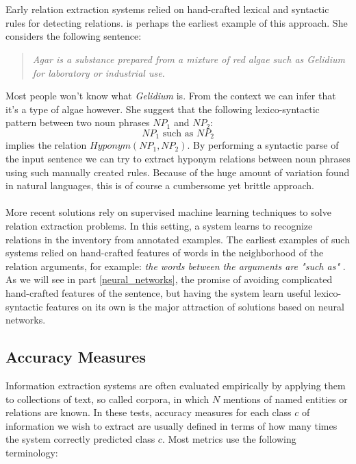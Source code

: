 \\\\
Early relation extraction systems relied on hand-crafted lexical and syntactic rules for detecting relations. \citet{hearst1992} is perhaps the earliest example of this approach. She considers the following sentence:
\begin{quote}
	\textit{Agar is a substance prepared from a mixture of red algae such as Gelidium for laboratory or industrial use.}
\end{quote}
Most people won't know what \textit{Gelidium} is. From the context we can infer that it's a type of algae however. She suggest that the following lexico-syntactic pattern between two noun phrases $NP_1$ and $NP_2$:
$$
NP_1\text{ such as }NP_2
$$
implies the relation $Hyponym(NP_1, NP_2)$. By performing a syntactic parse of the input sentence we can try to extract hyponym relations between noun phrases using such manually created rules. Because of the huge amount of variation found in natural languages, this is of course a cumbersome yet brittle approach.
\\\\
More recent solutions rely on supervised machine learning techniques to solve relation extraction problems. In this setting, a system learns to recognize relations in the inventory from annotated examples. The earliest examples of such systems relied on hand-crafted features of words in the neighborhood of the relation arguments, for example: \textit{the words between the arguments are "such as"} \citep{jurafsky09}. As we will see in part \ref{neural_networks}, the promise of avoiding complicated hand-crafted features of the sentence, but having the system learn useful lexico-syntactic features on its own is the major attraction of solutions based on neural networks.

\subsection{Accuracy Measures}
Information extraction systems are often evaluated empirically by applying them to collections of text, so called corpora, in which $N$ mentions of named entities or relations are known. In these tests, accuracy measures for each class $c$ of information we wish to extract are usually defined in terms of how many times the system correctly predicted class $c$. Most metrics use the following terminology:


